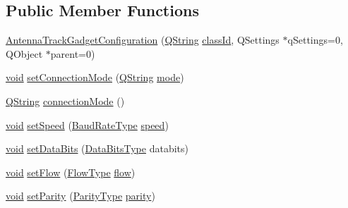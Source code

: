 \subsection*{Public Member Functions}
\begin{DoxyCompactItemize}
\item 
\hyperlink{group___antenna_track_gadget_plugin_gaab0b8cb9542f69d06b53e54d5bb4761a}{Antenna\-Track\-Gadget\-Configuration} (\hyperlink{group___u_a_v_objects_plugin_gab9d252f49c333c94a72f97ce3105a32d}{Q\-String} \hyperlink{group___core_plugin_gac953657221ba7fda967ada0408332641}{class\-Id}, Q\-Settings $\ast$q\-Settings=0, Q\-Object $\ast$parent=0)
\item 
\hyperlink{group___u_a_v_objects_plugin_ga444cf2ff3f0ecbe028adce838d373f5c}{void} \hyperlink{group___antenna_track_gadget_plugin_gaa8c80d59aa822d7e1a73288f8da1447d}{set\-Connection\-Mode} (\hyperlink{group___u_a_v_objects_plugin_gab9d252f49c333c94a72f97ce3105a32d}{Q\-String} \hyperlink{glext_8h_a1e71d9c196e4683cc06c4b54d53f7ef5}{mode})
\item 
\hyperlink{group___u_a_v_objects_plugin_gab9d252f49c333c94a72f97ce3105a32d}{Q\-String} \hyperlink{group___antenna_track_gadget_plugin_ga016616d69e43834c0b010babbbb20b04}{connection\-Mode} ()
\item 
\hyperlink{group___u_a_v_objects_plugin_ga444cf2ff3f0ecbe028adce838d373f5c}{void} \hyperlink{group___antenna_track_gadget_plugin_ga657a8ae2f677f817ea6378959145290c}{set\-Speed} (\hyperlink{qextserialport_8h_a6f031169a6a9b150b5af707bb23cf010}{Baud\-Rate\-Type} \hyperlink{group___antenna_track_gadget_plugin_ga9f04acbb3e66e621c35afaa756e61cb0}{speed})
\item 
\hyperlink{group___u_a_v_objects_plugin_ga444cf2ff3f0ecbe028adce838d373f5c}{void} \hyperlink{group___antenna_track_gadget_plugin_ga36f5c3e37039cfa6f3ea79d53339db3f}{set\-Data\-Bits} (\hyperlink{qextserialport_8h_a189ef78c2c1b7537ab114d576f6214fa}{Data\-Bits\-Type} databits)
\item 
\hyperlink{group___u_a_v_objects_plugin_ga444cf2ff3f0ecbe028adce838d373f5c}{void} \hyperlink{group___antenna_track_gadget_plugin_gab8a02ca68afcbac2db3db1df1f777695}{set\-Flow} (\hyperlink{qextserialport_8h_a02ad1c7cf791a069dd54e409f8db4790}{Flow\-Type} \hyperlink{group___antenna_track_gadget_plugin_ga6c02451beb6f94db4d3c67bd13fa9c3e}{flow})
\item 
\hyperlink{group___u_a_v_objects_plugin_ga444cf2ff3f0ecbe028adce838d373f5c}{void} \hyperlink{group___antenna_track_gadget_plugin_gae386222c5ab2b4132f1f09afd058f48f}{set\-Parity} (\hyperlink{qextserialport_8h_aee22d32d87c815090354bf9b8e957ace}{Parity\-Type} \hyperlink{group___antenna_track_gadget_plugin_ga24493de658f97012f89d15d6058bc1f7}{parity})

\end{DoxyCompactItemize}
